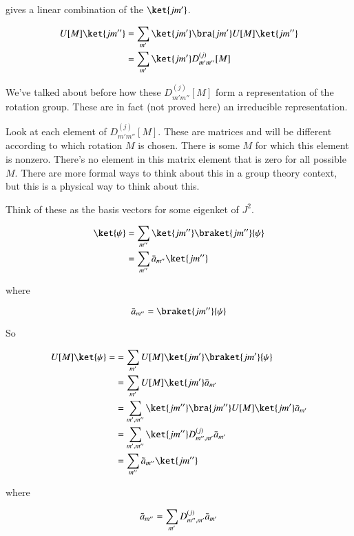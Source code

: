 gives a linear combination of the $\ket{j m'}$.

\begin{align*}
U[M] \ket{j m''} 
&=
\sum_{m'} \ket{j m'} \bra{j m'} U[M] \ket{j m''}  
\\
&=
\sum_{m'} \ket{j m'} 
D^{(j)}_{m' m''}[M] 
\\
\end{align*}

We've talked about before how these $D^{(j)}_{m' m''}[M]$ form a representation of the rotation group.  These are in fact (not proved here) an irreducible representation.

Look at each element of $D^{(j)}_{m' m''}[M]$.  These are matrices and will be different according to which rotation $M$ is chosen.  There is some $M$ for which this element is nonzero.  There's no element in this matrix element that is zero for all possible $M$.  There are more formal ways to think about this in a group theory context, but this is a physical way to think about this.

Think of these as the basis vectors for some eigenket of $J^2$.

\begin{align*}
\ket{\psi} 
&= \sum_{m''} \ket{j m''} \braket{j m''}{\psi} \\
&= \sum_{m''} \bar{a}_{m''} \ket{j m''}
\end{align*}

where

\begin{equation}\label{eqn:qmTwoL19:250}
\bar{a}_{m''} = \braket{j m''}{\psi} 
\end{equation}

So

\begin{align*}
U[M] \ket{\psi} = 
&= \sum_{m'} U[M] \ket{j m'} \braket{j m'}{\psi} \\
&= \sum_{m'} U[M] \ket{j m'} \bar{a}_{m'} \\
&= \sum_{m', m''} 
\ket{j m''} \bra{j m''}
U[M] \ket{j m'} \bar{a}_{m'} \\
&= \sum_{m', m''} 
\ket{j m''} 
D^{(j)}_{m'', m'}
\bar{a}_{m'} \\
&= \sum_{m''} 
\tilde{a}_{m''} 
\ket{j m''} 
\end{align*}

where 

\begin{equation}\label{eqn:qmTwoL19:270}
\tilde{a}_{m''} = \sum_{m'} D^{(j)}_{m'', m'} \bar{a}_{m'} \\
\end{equation}

